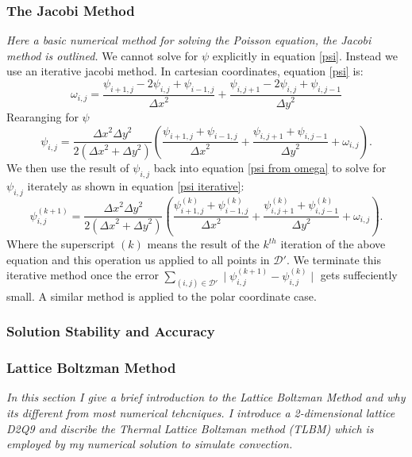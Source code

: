 \documentclass{article}
\begin{document}
\subsubsection*{The Jacobi Method}
{\it{Here a basic numerical method for solving the Poisson equation, the Jacobi method is outlined.}}
We cannot solve for $\psi$ explicitly in equation \ref{psi}. Instead we use an iterative jacobi method. In cartesian coordinates, equation \ref{psi} is:
\begin{equation}
	\omega_{i,j} = \frac{\psi_{i+1,j} - 2 \psi_{i,j} + \psi_{i-1,j}  }{{\Delta x}^2} + \frac{\psi_{i,j+1} - 2 \psi_{i,j} + \psi_{i,j-1}  }{{\Delta y}^2}
	\label{psi disc}
\end{equation}
Rearanging for $\psi$
\begin{equation}
	\psi_{i,j} = \frac{{\Delta x}^2 {\Delta y}^2  }{2({\Delta x}^2  + {\Delta y}^2)} (\frac{\psi_{i+1,j} +\psi_{i-1,j} }{{\Delta x}^2} + \frac{\psi_{i,j+1} +\psi_{i,j-1}  }{{\Delta y}^2 }  + \omega_{i,j}).
	\label{psi from omega}
\end{equation}
We then use the result of $\psi_{i,j}$ back into equation \ref{psi from omega} to solve for $\psi_{i,j}$ iterately as shown in equation \ref{psi iterative}:
\begin{equation}
	\psi_{i,j}^{(k+1)} = \frac{{\Delta x}^2 {\Delta y}^2  }{2({\Delta x}^2  + {\Delta y}^2)} (\frac{\psi_{i+1,j}^{(k)} +\psi_{i-1,j}^{(k)}  }{{\Delta x}^2} + \frac{\psi_{i,j+1}^{(k)} +\psi_{i,j-1}^{(k)}  }{{\Delta y}^2 } + \omega_{i,j}).
	\label{psi iterative}
\end{equation}
Where the superscript $(k)$ means the result of the $k^{th}$ iteration of the above equation and this operation us applied to all points in $\mathcal{D}'$.
 We terminate this iterative method once the error $\sum_{(i,j) \in \mathcal{D'}} \mid \psi_{i,j}^{(k+1)} - \psi_{i,j}^{(k)} \mid$ gets suffeciently small. A similar method is applied to the polar coordinate case. 
 



\subsubsection*{Solution Stability and Accuracy}

 


\subsubsection*{Lattice Boltzman Method}
{\it{In this section I give a brief introduction to the Lattice Boltzman Method and why its different from most numerical tehcniques. I introduce a 2-dimensional lattice D2Q9 and discribe the Thermal Lattice Boltzman method (TLBM) which is employed by my numerical solution to simulate convection.}}
\vspace{0.3cm}
\end{document}
